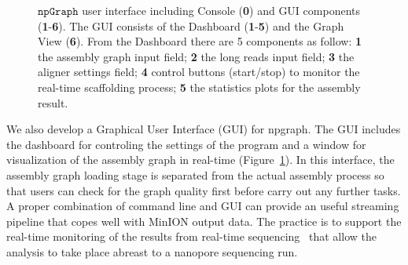\documentclass[10pt,twocolumn,twoside]{genpaper}
\newcommand{\npgraph}{$\mathtt{npGraph}$}
\newcommand{\minimap}{$\mathtt{minimap2}$}
\newcommand{\bwa}{$\mathtt{BWA\text{-}MEM}$}
\newcommand{\EG}{\emph{e.g.}}
\begin{document}
\begin{figure}[!hpt]
{{    }
}
\caption[\npgraph{} user interface]{\npgraph{} user interface including Console (\textbf{0}) and GUI components (\textbf{1}-\textbf{6}). The GUI consists of the Dashboard (\textbf{1}-\textbf{5}) and the Graph View (\textbf{6}). From the Dashboard there are 5 components as follow: \textbf{1} the assembly graph input field; \textbf{2} the long reads input field; \textbf{3} the aligner settings field; \textbf{4} control buttons (start/stop) to monitor the real-time scaffolding process; \textbf{5} the statistics plots for the assembly result.}
\label{figure:npgraph_gui}
\end{figure}

We also develop a Graphical User Interface (GUI) for npgraph. The GUI includes the dashboard for controling the settings of the program and a window for visualization of the assembly graph 
in real-time (Figure~\ref{figure:npgraph_gui}). 
In this interface, the assembly graph loading stage is separated from the actual assembly process so that users can check for the graph quality first before carry out any further tasks.
A proper combination of command line and GUI can provide an useful streaming pipeline that copes well with MinION output data. The practice is to support the real-time monitoring of
the results from real-time sequencing~\cite{CaoGC2016,Cao2017scaffolding,Nguyen2017barcode} that allow the analysis to take place abreast to a nanopore sequencing run.

\end{document}
